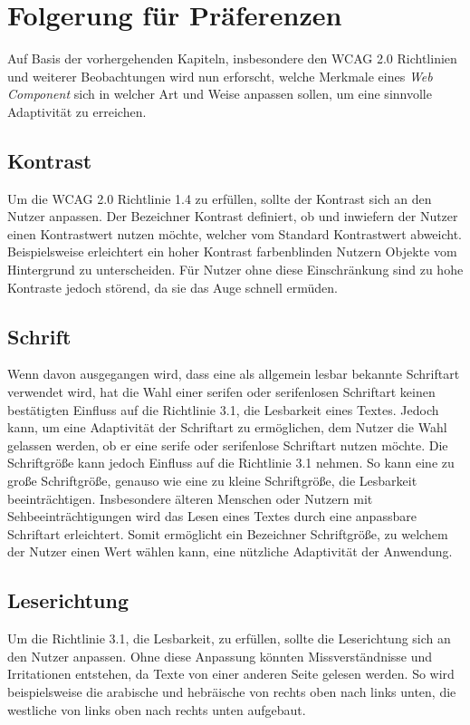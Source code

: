\documentclass[12pt, paper=a4, bibtotoc, toc=listof, headsepline=true]{scrreprt}
\begin{document}
\section{Folgerung für Präferenzen}
\label{sec:folFuePra}
Auf Basis der vorhergehenden Kapiteln, insbesondere den \ac{WCAG 2.0} Richtlinien und weiterer Beobachtungen wird nun erforscht, welche Merkmale eines \emph{Web Component} sich in welcher Art und Weise anpassen sollen, um eine sinnvolle Adaptivität zu erreichen.
\subsection{Kontrast}
Um die \ac{WCAG 2.0} Richtlinie 1.4 zu erfüllen, sollte der Kontrast sich an den Nutzer anpassen. Der Bezeichner Kontrast definiert, ob und inwiefern der Nutzer einen Kontrastwert nutzen möchte, welcher vom Standard Kontrastwert abweicht. Beispielsweise erleichtert ein hoher Kontrast farbenblinden Nutzern Objekte vom Hintergrund zu unterscheiden. Für Nutzer ohne diese Einschränkung sind zu hohe Kontraste jedoch störend, da sie das Auge schnell ermüden\cite[S.234]{balzert2009webdesign}.
\subsection{Schrift}
Wenn davon ausgegangen wird, dass eine als allgemein lesbar bekannte Schriftart verwendet wird, hat die Wahl einer serifen oder serifenlosen Schriftart keinen bestätigten Einfluss auf die Richtlinie 3.1, die Lesbarkeit eines Textes\cite[S.157-161]{barrierefreiheit}. Jedoch kann, um eine Adaptivität der Schriftart zu ermöglichen, dem Nutzer die Wahl gelassen werden, ob er eine serife oder serifenlose Schriftart nutzen möchte.
Die Schriftgröße kann jedoch Einfluss auf die Richtlinie 3.1 nehmen. So kann eine zu große Schriftgröße, genauso wie eine zu kleine Schriftgröße, die Lesbarkeit beeinträchtigen. Insbesondere älteren Menschen oder Nutzern mit Sehbeeinträchtigungen wird das Lesen eines Textes durch eine anpassbare Schriftart erleichtert\cite[S.152]{barrierefreiheit}. Somit ermöglicht ein Bezeichner Schriftgröße, zu welchem der Nutzer einen Wert wählen kann, eine nützliche Adaptivität der Anwendung. 
\subsection{Leserichtung}
\label{ref:lesRic}
Um die Richtlinie 3.1, die Lesbarkeit, zu erfüllen, sollte die Leserichtung sich an den Nutzer anpassen. Ohne diese Anpassung könnten Missverständnisse und Irritationen entstehen, da Texte von einer anderen Seite gelesen werden. So wird beispielsweise die arabische und hebräische von rechts oben nach links unten, die westliche von links oben nach rechts unten aufgebaut\cite[S.148]{emrich2013interkulturelles}.
\end{document}
